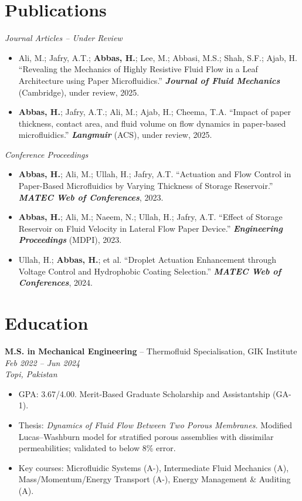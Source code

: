 \documentclass[11pt,a4paper]{article}
\begin{document}
\section{Publications}

\textit{Journal Articles -- Under Review}
\begin{itemize}
  \item Ali, M.; Jafry, A.T.; \textbf{Abbas, H.}; Lee, M.; Abbasi, M.S.; Shah,
        S.F.; Ajab, H. ``Revealing the Mechanics of Highly Resistive Fluid Flow in
        a Leaf Architecture using Paper Microfluidics.''
        \textbf{\textit{Journal of Fluid Mechanics}} (Cambridge), under review,
        2025.
  \item \textbf{Abbas, H.}; Jafry, A.T.; Ali, M.; Ajab, H.; Cheema, T.A.
        ``Impact of paper thickness, contact area, and fluid volume on flow
        dynamics in paper-based microfluidics.''
        \textbf{\textit{Langmuir}} (ACS), under review, 2025.
\end{itemize}

\vspace{4pt}
\textit{Conference Proceedings}
\begin{itemize}
  \item \textbf{Abbas, H.}; Ali, M.; Ullah, H.; Jafry, A.T. ``Actuation and Flow
        Control in Paper-Based Microfluidics by Varying Thickness of Storage
        Reservoir.'' \textbf{\textit{MATEC Web of Conferences}}, 2023.
  \item \textbf{Abbas, H.}; Ali, M.; Naeem, N.; Ullah, H.; Jafry, A.T. ``Effect
        of Storage Reservoir on Fluid Velocity in Lateral Flow Paper Device.''
        \textbf{\textit{Engineering Proceedings}} (MDPI), 2023.
  \item Ullah, H.; \textbf{Abbas, H.}; et al. ``Droplet Actuation Enhancement
        through Voltage Control and Hydrophobic Coating Selection.''
        \textbf{\textit{MATEC Web of Conferences}}, 2024.
\end{itemize}

\section{Education}

\textbf{M.S. in Mechanical Engineering} -- Thermofluid Specialisation, GIK
Institute \hfill \textit{Feb 2022 -- Jun 2024}\\
\textit{Topi, Pakistan}
\begin{itemize}
  \item GPA: 3.67/4.00. Merit-Based Graduate Scholarship and Assistantship (GA-1).
  \item Thesis: \textit{Dynamics of Fluid Flow Between Two Porous Membranes.}
        Modified Lucas--Washburn model for stratified porous assemblies with
        dissimilar permeabilities; validated to below 8\% error.
  \item Key courses: Microfluidic Systems (A-), Intermediate Fluid Mechanics (A),
        Mass/Momentum/Energy Transport (A-), Energy Management \& Auditing (A).
\end{itemize}
\end{document}
